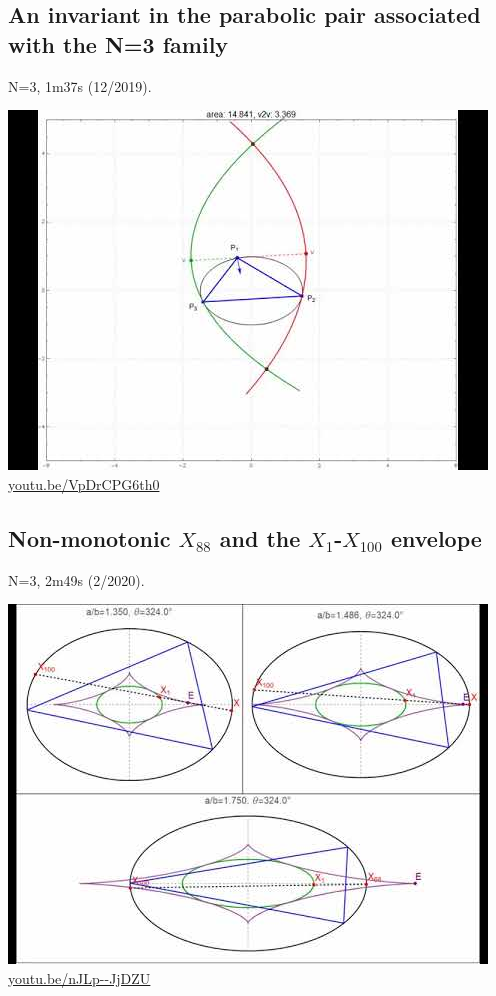 \documentclass[12pt]{amsart}
\begin{document}
\subsection{An invariant in the parabolic pair associated with the N=3 family}
\label{vid:VpDrCPG6th0}
\noindent N=3, 1m37s (12/2019). 
\begin{center}\includegraphics[width=.5\textwidth]{pics/VpDrCPG6th0.jpg} \\ 
\href{https://youtu.be/VpDrCPG6th0}{\url{youtu.be/VpDrCPG6th0}}\end{center}
% 

\subsection{Non-monotonic $X_{88}$ and the $X_{1}$-$X_{100}$ envelope}
\label{vid:nJLp--JjDZU}
\noindent N=3, 2m49s (2/2020). 
\begin{center}\includegraphics[width=.5\textwidth]{pics/nJLp--JjDZU.jpg} \\ 
\href{https://youtu.be/nJLp--JjDZU}{\url{youtu.be/nJLp--JjDZU}}\end{center}
% 
\end{document}
